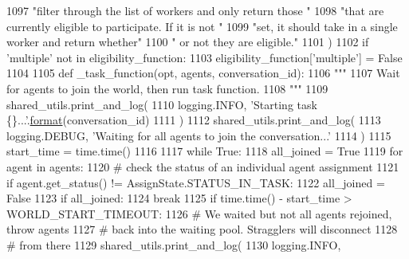 \begin{DoxyCode}
1097                     \textcolor{stringliteral}{"filter through the list of workers and only return those "}
1098                     \textcolor{stringliteral}{"that are currently eligible to participate. If it is not "}
1099                     \textcolor{stringliteral}{"set, it should take in a single worker and return whether"}
1100                     \textcolor{stringliteral}{" or not they are eligible."}
1101                 )
1102             \textcolor{keywordflow}{if} \textcolor{stringliteral}{'multiple'} \textcolor{keywordflow}{not} \textcolor{keywordflow}{in} eligibility\_function:
1103                 eligibility\_function[\textcolor{stringliteral}{'multiple'}] = \textcolor{keyword}{False}
1104 
1105         \textcolor{keyword}{def }\_task\_function(opt, agents, conversation\_id):
1106             \textcolor{stringliteral}{"""}
1107 \textcolor{stringliteral}{            Wait for agents to join the world, then run task function.}
1108 \textcolor{stringliteral}{            """}
1109             shared\_utils.print\_and\_log(
1110                 logging.INFO, \textcolor{stringliteral}{'Starting task \{\}...'}.\hyperlink{namespaceparlai_1_1chat__service_1_1services_1_1messenger_1_1shared__utils_a32e2e2022b824fbaf80c747160b52a76}{format}(conversation\_id)
1111             )
1112             shared\_utils.print\_and\_log(
1113                 logging.DEBUG, \textcolor{stringliteral}{'Waiting for all agents to join the conversation...'}
1114             )
1115             start\_time = time.time()
1116 
1117             \textcolor{keywordflow}{while} \textcolor{keyword}{True}:
1118                 all\_joined = \textcolor{keyword}{True}
1119                 \textcolor{keywordflow}{for} agent \textcolor{keywordflow}{in} agents:
1120                     \textcolor{comment}{# check the status of an individual agent assignment}
1121                     \textcolor{keywordflow}{if} agent.get\_status() != AssignState.STATUS\_IN\_TASK:
1122                         all\_joined = \textcolor{keyword}{False}
1123                 \textcolor{keywordflow}{if} all\_joined:
1124                     \textcolor{keywordflow}{break}
1125                 \textcolor{keywordflow}{if} time.time() - start\_time > WORLD\_START\_TIMEOUT:
1126                     \textcolor{comment}{# We waited but not all agents rejoined, throw agents}
1127                     \textcolor{comment}{# back into the waiting pool. Stragglers will disconnect}
1128                     \textcolor{comment}{# from there}
1129                     shared\_utils.print\_and\_log(
1130                         logging.INFO,

\end{DoxyCode}
